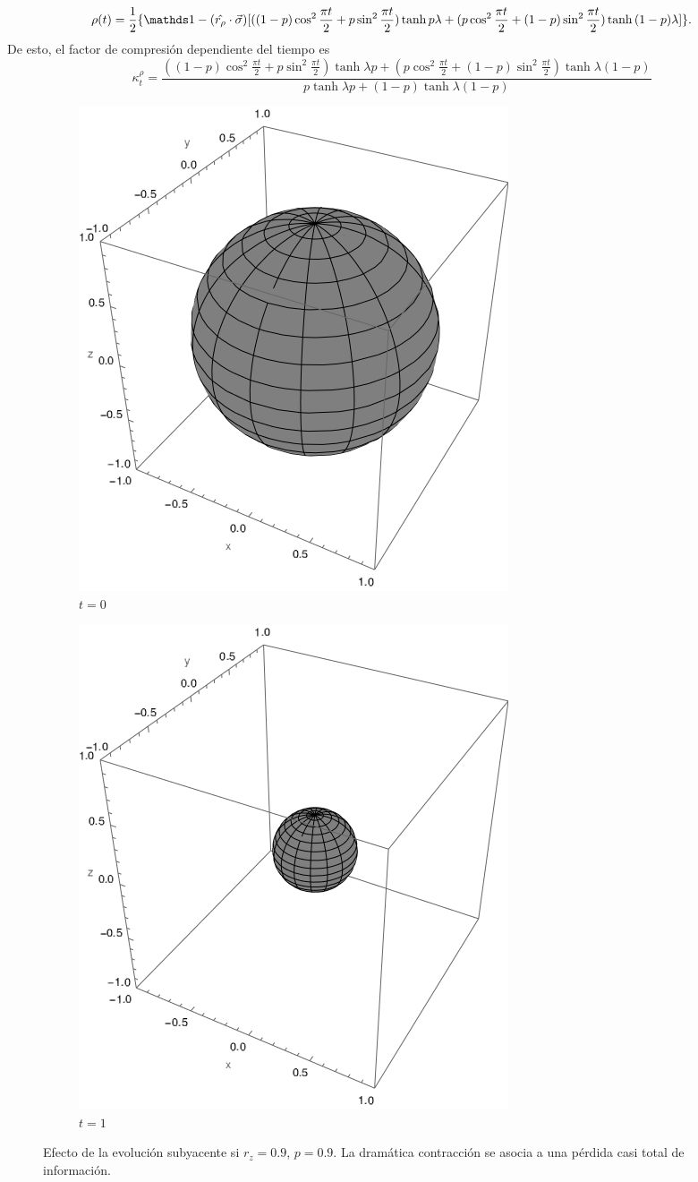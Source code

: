 \begin{equation}
  \rho(t)=\frac{1}{2}\{\Id-(\hat{r_{\rho}}\cdot\vec{\sigma})[((1-p)\cos^{2}{\frac{\pi t}{2}}+p\sin^{2}{\frac{\pi t}{2}})\tanh{p\lambda}+(p\cos^{2}{\frac{\pi t}{2}}+(1-p)\sin^{2}{\frac{\pi t}{2}})\tanh{(1-p)\lambda}]\}.
\end{equation}
De esto, el factor de compresión dependiente del tiempo es
\begin{equation}\label{eq:SWAPFactort}
  \kappa_{t}^{\rho}=\frac{((1-p)\cos^{2}{\frac{\pi t}{2}}+p\sin^{2}{\frac{\pi t}{2}})\tanh{\lambda p}+(p\cos^{2}{\frac{\pi t}{2}}+(1-p)\sin^{2}{\frac{\pi t}{2}})\tanh{\lambda (1-p)}}{
    p\tanh{\lambda p}+(1-p)\tanh{\lambda (1-p)}}
\end{equation}

\begin{figure}[h!]
  \centering
  \begin{subfigure}{0.475\textwidth}
    \centering
    \includegraphics[width=0.6\linewidth]{maxent/figures/sphere_swapcontraction_t=0_z=0.9_p=0.9.png}
    \caption{$t=0$}
  \end{subfigure}%
  \begin{subfigure}{0.475\textwidth}
    \centering
    \includegraphics[width=0.6\linewidth]{maxent/figures/sphere_swapcontraction_t=1_z=0.9_p=0.9.png}
    \caption{$t=1$}
  \end{subfigure}
  \caption{Efecto de la evolución subyacente si $r_{z}=0.9$, $p=0.9$. La dramática contracción se asocia a una pérdida casi total de información.}
  \label{fig:SWAPFactorSequence}
  \end{figure}
